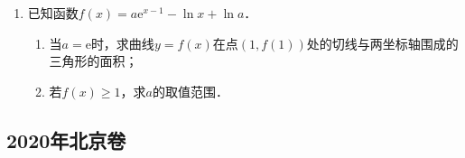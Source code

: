\begin{description}
\begin{enumerate}[leftmargin=5pt]
\begin{enumerate}[label=(\arabic*)]
            \item 求$C$方程；
            \item 点$N$为椭圆上任意一点，求$\triangle AMN$的面积的最大值．
        \end{enumerate}
        \item 已知函数$f(x)=a\mathrm{e}^{x-1}-\ln x+\ln a$．
        \begin{enumerate}[label=(\arabic*)]
            \item 当$a=\mathrm{e}$时，求曲线$y=f(x)$在点$(1,f(1))$处的切线与两坐标轴围成的三角形的面积；
            \item 若$f(x)\geqslant 1$，求$a$的取值范围．
        \end{enumerate}
    \end{enumerate}
\end{description}
\clearpage

\subsection{2020年北京卷}\label{gk:2020年北京卷}

